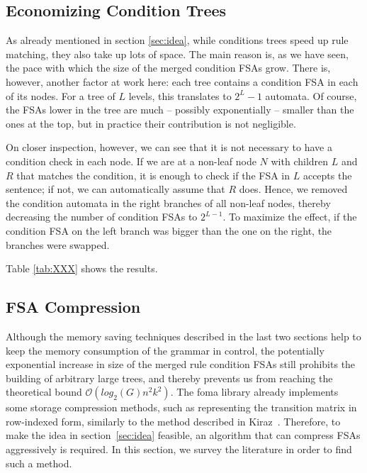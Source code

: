 \documentclass{article}
\begin{document}
\subsection{Economizing Condition Trees}

As already mentioned in section \ref{sec:idea}, while conditions trees speed up
rule matching, they also take up lots of space. The main reason is, as we have
seen, the pace with which the size of the merged condition FSAs grow. There is,
however, another factor at work here: each tree contains a condition FSA in each
of its nodes. For a tree of $L$ levels, this translates to $2^L - 1$ automata.
Of course, the FSAs lower in the tree are much -- possibly exponentially --
smaller than the ones at the top, but in practice their contribution is not
negligible.

On closer inspection, however, we can see that it is not necessary to have a
condition check in each node. If we are at a non-leaf node $N$ with children
$L$ and $R$ that matches the condition, it is enough to check if the FSA in
$L$ accepts the sentence; if not, we can automatically assume that $R$ does.
Hence, we removed the condition automata in the right branches of all non-leaf
nodes, thereby decreasing the number of condition FSAs to $2^{L-1}$. To maximize
the effect, if the condition FSA on the left branch was bigger than the one on
the right, the branches were swapped.

Table \ref{tab:XXX} shows the results.

\subsection{FSA Compression}

Although the memory saving techniques described in the last two sections help to
keep the memory consumption of the grammar in control, the potentially
exponential increase in size of the merged rule condition FSAs still prohibits
the building of arbitrary large trees, and thereby prevents us from reaching
the theoretical bound $\mathcal{O}(log_2(G)n^2k^2)$. The foma library already
implements some storage compression methods, such as representing the transition
matrix in row-indexed form, similarly to the method described in Kiraz~.
Therefore, to make the idea in section~\ref{sec:idea} feasible, an algorithm that
can compress FSAs aggressively is required. %
In this section, we survey the literature in order to find such a method.
\end{document}
